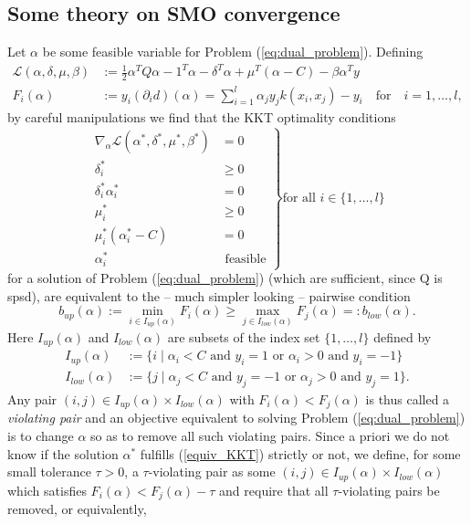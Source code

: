 \subsection{Some theory on SMO convergence}
Let $\alpha$ be some feasible variable for Problem (\ref{eq:dual_problem}). Defining
\begin{align*}
\mathcal{L}(\alpha,\delta,\mu,\beta) &:= \frac{1}{2} \alpha^T Q \alpha - 1^T \alpha - \delta^T\alpha + \mu^T(\alpha - C) - \beta \alpha^T y \\
F_i(\alpha) &:= y_i (\partial_i d)(\alpha) = \sum_{i = 1}^l \alpha_j y_j k(x_i,x_j) - y_i \quad \text{for} \quad i = 1,\ldots,l,
\end{align*}
by careful manipulations we find that the KKT optimality conditions
\begin{equation*}
\left.
\begin{aligned}
\nabla_{\alpha} \mathcal{L}(\alpha^*,\delta^*,\mu^*,\beta^*) &= 0\\
\delta_i^* &\geq 0\\
\delta_i^* \alpha_i^* &= 0\\
\mu_i^* &\geq 0\\
\mu_i^* (\alpha_i^*-C) &= 0\\
\alpha_i^* &\text{ feasible}
\end{aligned}
\right\} \text{for all } i \in \{1,\ldots,l\}
\end{equation*}
for a solution of Problem (\ref{eq:dual_problem}) (which are sufficient, since Q is spsd), are equivalent to the -- much simpler looking -- pairwise condition
\begin{equation*}\label{equiv_KKT}
b_{up}(\alpha) := \min_{i \in I_{up}(\alpha)} F_i(\alpha) \geq \max_{j \in I_{low}(\alpha)} F_j(\alpha) =: b_{low}(\alpha).
\end{equation*}
Here $I_{up}(\alpha)$ and $I_{low}(\alpha)$ are subsets of the index set $\{1,\ldots,l\}$ defined by
\begin{align*}
I_{up}(\alpha) &:= \{ i  \mid  \alpha_i < C \text{ and } y_i = 1 \text{ or } \alpha_i > 0 \text{ and } y_i = -1 \} \\
I_{low}(\alpha) &:= \{ j \mid \alpha_j < C \text{ and } y_j = -1 \text{ or } \alpha_j > 0 \text{ and } y_j = 1 \}.
\end{align*} 
Any pair $(i,j) \in I_{up}(\alpha) \times I_{low}(\alpha)$ with $F_i(\alpha) < F_j(\alpha)$ is thus called a \textit{violating pair} and an objective equivalent to solving Problem (\ref{eq:dual_problem}) is to change $\alpha$ so as to remove all such violating pairs. Since a priori we do not know if the solution $\alpha^*$ fulfills (\ref{equiv_KKT}) strictly or not, we define, for some small tolerance $\tau > 0$, a $\tau$-violating pair as some $(i,j) \in I_{up}(\alpha) \times I_{low}(\alpha)$ which satisfies $F_i(\alpha) < F_j(\alpha) - \tau$ and require that all $\tau$-violating pairs be removed, or equivalently, 
